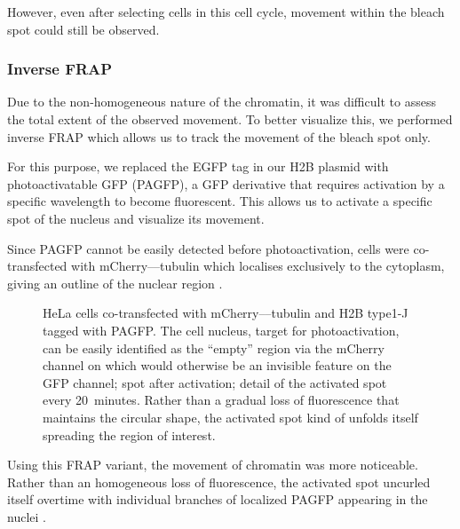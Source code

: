       However, even after selecting cells in this cell cycle, movement within
      the bleach spot could still be observed.

    \subsubsection{Inverse FRAP}

      Due to the non-homogeneous nature of the chromatin, it was difficult
      to assess the total extent of the observed movement. To
      better visualize this, we performed inverse FRAP which allows us
      to track the movement of the bleach spot only.

      For this purpose, we replaced the EGFP tag in our H2B plasmid
      with photoactivatable GFP (PAGFP), a GFP derivative that requires
      activation by a specific wavelength to become fluorescent. This
      allows us to activate a specific spot of the nucleus and visualize
      its movement.

      Since PAGFP cannot be easily detected before photoactivation, cells
      were co-transfected with mCherry--\textalpha--tubulin which localises
      exclusively to the cytoplasm, giving an outline of the nuclear region
      .

      \begin{figure}
        \centering
        \hfill
          {
            HeLa cells co-transfected with mCherry--\textalpha--tubulin and
            H2B type1-J tagged with PAGFP.
             The cell nucleus, target
            for photoactivation, can be easily identified as the ``empty''
            region via the mCherry channel on which would otherwise be an
            invisible feature on the GFP channel;
             spot after activation;
             detail of the
            activated spot every 20~minutes. Rather than a gradual loss of
            fluorescence that maintains the circular shape, the activated spot
            kind of unfolds itself spreading the region of interest.
          }
        \label{fig:kill-frap:ifrap}
      \end{figure}

      Using this FRAP variant, the movement of chromatin was more noticeable.
      Rather than an homogeneous loss of fluorescence, the activated
      spot uncurled itself overtime with individual branches of
      localized PAGFP appearing in the nuclei .
